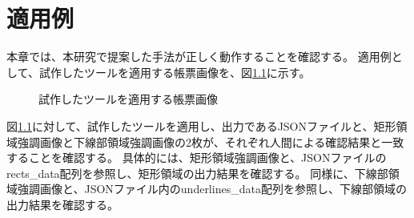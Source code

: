 \chapter{適用例}\label{cha:Indication}
本章では、本研究で提案した手法が正しく動作することを確認する。
適用例として、試作したツールを適用する帳票画像を、図\ref{fig:indication_original}に示す。

\begin{figure}[t]
    \begin{center}
        \caption{試作したツールを適用する帳票画像}
        \label{fig:indication_original}
    \end{center}
\end{figure}

図\ref{fig:indication_original}に対して、試作したツールを適用し、出力であるJSONファイルと、矩形領域強調画像と下線部領域強調画像の2枚が、それぞれ人間による確認結果と一致することを確認する。
具体的には、矩形領域強調画像と、JSONファイルのrects\_data配列を参照し、矩形領域の出力結果を確認する。
同様に、下線部領域強調画像と、JSONファイル内のunderlines\_data配列を参照し、下線部領域の出力結果を確認する。

